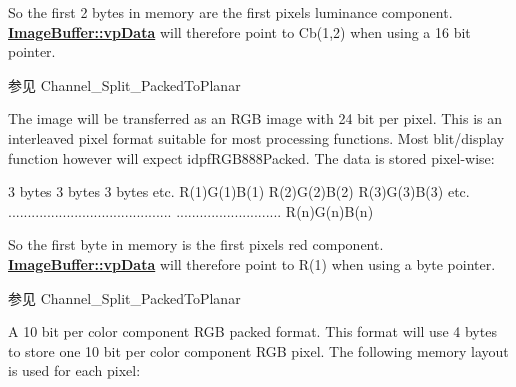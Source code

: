 \begin{Desc}
\begin{description}
So the first 2 bytes in memory are the first pixels luminance component. {\bfseries \hyperlink{struct_image_buffer_ab67c9c21d749e786302c848b508e0673}{Image\+Buffer\+::vp\+Data}} will therefore point to Cb(1,2) when using a 16 bit pointer.

\begin{DoxySeeAlso}{参见}
Channel\+\_\+\+Split\+\_\+\+Packed\+To\+Planar 
\end{DoxySeeAlso}
\item[{\em 
\hypertarget{group___common_interface_gga02e0fc32ff10e0bc0f2e8b9c321d65c9a64c1da7a9b3310c7b4286445a81ee27b}{idpf\+B\+G\+R888\+Packed}\label{group___common_interface_gga02e0fc32ff10e0bc0f2e8b9c321d65c9a64c1da7a9b3310c7b4286445a81ee27b}
}]The image will be transferred as an R\+G\+B image with 24 bit per pixel. This is an interleaved pixel format suitable for most processing functions. Most blit/display function however will expect idpf\+R\+G\+B888\+Packed. The data is stored pixel-\/wise\+:


\begin{DoxyCode}
3 bytes        3 bytes        3 bytes      etc.
R(1)G(1)B(1)   R(2)G(2)B(2)   R(3)G(3)B(3) etc.
..........................................
...........................   R(n)G(n)B(n)
\end{DoxyCode}


So the first byte in memory is the first pixels red component. {\bfseries \hyperlink{struct_image_buffer_ab67c9c21d749e786302c848b508e0673}{Image\+Buffer\+::vp\+Data}} will therefore point to R(1) when using a byte pointer.

\begin{DoxySeeAlso}{参见}
Channel\+\_\+\+Split\+\_\+\+Packed\+To\+Planar 
\end{DoxySeeAlso}
\item[{\em 
\hypertarget{group___common_interface_gga02e0fc32ff10e0bc0f2e8b9c321d65c9a0f6e70ba9178023b47016303366d2c23}{idpf\+B\+G\+R101010\+Packed\+\_\+\+V2}\label{group___common_interface_gga02e0fc32ff10e0bc0f2e8b9c321d65c9a0f6e70ba9178023b47016303366d2c23}
}]A 10 bit per color component R\+G\+B packed format. This format will use 4 bytes to store one 10 bit per color component R\+G\+B pixel. The following memory layout is used for each pixel\+:



\end{description}
\end{Desc}
